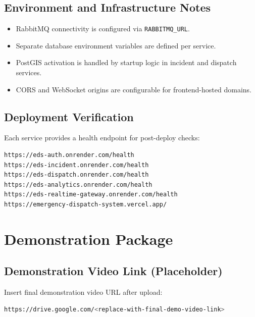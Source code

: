\documentclass[12pt,a4paper]{report}
\begin{document}
\section{Environment and Infrastructure Notes}

\begin{itemize}
	\item RabbitMQ connectivity is configured via \texttt{RABBITMQ\_URL}.
	\item Separate database environment variables are defined per service.
	\item PostGIS activation is handled by startup logic in incident and dispatch services.
	\item CORS and WebSocket origins are configurable for frontend-hosted domains.
\end{itemize}

\section{Deployment Verification}

Each service provides a health endpoint for post-deploy checks:

\begin{lstlisting}[language=bash, caption=Health Verification Endpoints, numbers=none]
https://eds-auth.onrender.com/health
https://eds-incident.onrender.com/health
https://eds-dispatch.onrender.com/health
https://eds-analytics.onrender.com/health
https://eds-realtime-gateway.onrender.com/health
https://emergency-dispatch-system.vercel.app/
\end{lstlisting}

\newpage

\chapter{Demonstration Package}

\section{Demonstration Video Link (Placeholder)}

Insert final demonstration video URL after upload:

\begin{lstlisting}[language=bash, caption=Video Link Placeholder, numbers=none]
https://drive.google.com/<replace-with-final-demo-video-link>
\end{lstlisting}
\end{document}
